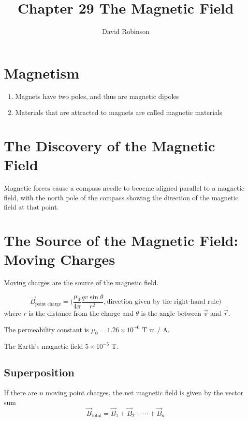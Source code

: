 \documentclass{article}
\title{Chapter 29 The Magnetic Field}
\author{David Robinson}
\date{}
\begin{document}
\maketitle

\section*{Magnetism}
\begin{enumerate}
    \item Magnets have two poles, and thus are magnetic dipoles
    \item Materials that are attracted to magnets are called magnetic materials
\end{enumerate}

\section*{The Discovery of the Magnetic Field}
Magnetic forces cause a compass needle to beocme aligned parallel to a magnetic field, with the
north pole of the compass showing the direction of the magnetic field at that point.

\section*{The Source of the Magnetic Field: Moving Charges}
Moving charges are the source of the magnetic field.

\[\vec{B}_\text{point charge}=\Big(\frac{\mu_0}{4\pi}\frac{qv\sin \theta}{r^2},
\text{direction given by the right-hand rule}\Big)\]
where $r$ is the distance from the charge and $\theta$ is the angle between $\vec{v}$ and
$\vec{r}$.

\vspace{1em}

The permeability constant is $\mu_0 = 1.26\times 10^{-6} \text{ T m / A}$.

\vspace{1em}

The Earth's magnetic field $5\times 10^{-5} \text{ T}$.

\subsection*{Superposition}
If there are $n$ moving point charges, the net magnetic field is given by the vector sum
\[\vec{B}_\text{total}=\vec{B}_1+\vec{B}_2 + \cdots + \vec{B}_n\]

\pagebreak
\end{document}
